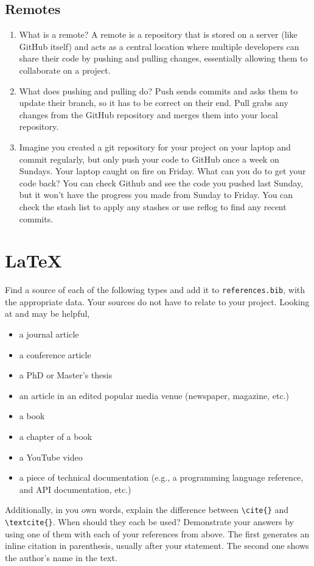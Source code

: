 \documentclass[10pt,twocolumn]{article}
\begin{document}
\subsection{Remotes}

\begin{enumerate}
\item What is a remote?
A remote is a repository that is stored on a server (like GitHub itself) and acts as a central location where multiple developers can share their code by pushing and pulling changes, essentially allowing them to collaborate on a project. 
\item What does pushing and pulling do?
 Push sends commits and asks them to update their branch, so it has to be correct on their end. Pull grabs any changes from the GitHub repository and merges them into your local repository.

\item Imagine you created a git repository for your project on your laptop and commit regularly, but only push your code to GitHub once a week on Sundays. Your laptop caught on fire on Friday. What can you do to get your code back?
\newline You can check Github and see the code you pushed last Sunday, but it won't have the progress you made from Sunday to Friday. You can check the stash list to apply any stashes or use reflog to find any recent commits. 
\end{enumerate}

\section{\LaTeX}

Find a source of each of the following types and add it to \texttt{references.bib}, with the appropriate data. Your sources do not have to relate to your project. Looking at \textcite{OverleafBibliographyManagement} and \textcite{WikipediaBibtex} may be helpful,

\begin{itemize}
\item a journal article
\item a conference article
\item a PhD or Master's thesis
\item an article in an edited popular media venue (newspaper, magazine, etc.)
\item a book
\item a chapter of a book
\item a YouTube video
\item a piece of technical documentation (e.g., a programming language reference, and API documentation, etc.)
\end{itemize}

Additionally, in you own words, explain the difference between \texttt{{\textbackslash}cite\{\}} and \texttt{{\textbackslash}textcite\{\}}. When should they each be used? Demonstrate your answers by using one of them with each of your references from above.
The first generates an inline citation in parenthesis, usually after your statement. The second one shows the author's name in the text. 
\printbibliography
\end{document}
